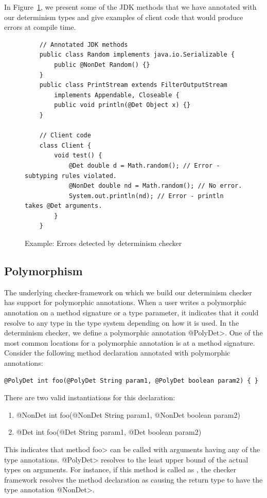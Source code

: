 In Figure~\ref{code-determinism}, we present some of the JDK methods that we have annotated with our determinism types and give examples of
client code that would produce errors at compile time.
\begin{figure}
    \begin{verbatim}
    // Annotated JDK methods
    public class Random implements java.io.Serializable {
        public @NonDet Random() {}
    }
    public class PrintStream extends FilterOutputStream 
        implements Appendable, Closeable {
        public void println(@Det Object x) {}
    }
    
    // Client code
    class Client {
        void test() {
            @Det double d = Math.random(); // Error - subtyping rules violated.
            @NonDet double nd = Math.random(); // No error.
            System.out.println(nd); // Error - println takes @Det arguments.
        }
    }
    \end{verbatim}
    \caption{Example: Errors detected by determinism checker}
    \label{code-determinism}
\end{figure}

\subsection{Polymorphism}\label{polymorphism}

The underlying checker-framework on which we build our determinism checker has support for
polymorphic annotations. When a user writes a polymorphic annotation on a method signature or a type parameter,
it indicates that it could resolve to any type in the type system depending on how it is used.
In the determinism checker, we define a polymorphic annotation \<@PolyDet>.
One of the most common locations for a polymorphic annotation is at a method signature.
Consider the following method declaration annotated with polymorphic annotations:
\begin{verbatim}
@PolyDet int foo(@PolyDet String param1, @PolyDet boolean param2) { }
\end{verbatim}
There are two valid instantiations for this declaration:
\begin{enumerate}
    \item @NonDet int foo(@NonDet String param1, @NonDet boolean param2) { }
    \item @Det int foo(@Det String param1, @Det boolean param2) { }
\end{enumerate}
This indicates that method \<foo> can be called with arguments having any of the  type annotations.
 \<@PolyDet> resolves to the least upper bound of
the actual types on arguments. For instance, if this method is called as , the 
checker framework resolves the method declaration as 
causing the return type to have the type annotation \<@NonDet>.


